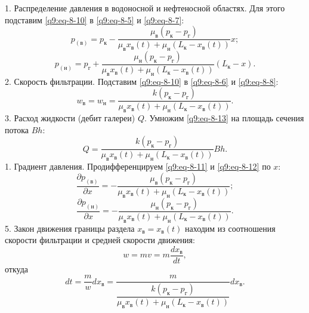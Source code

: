 1. Распределение давления в водоносной и нефтеносной областях. Для этого подставим \eqref{q9:eq-8-10} в \eqref{q9:eq-8-5} и \eqref{q9:eq-8-7}:
\begin{equation}p_{(\text{в})}=p_\text{к}-\frac{\mu_\text{в}(p_\text{к}-p_\text{г})}{\mu_\text{в}x_\text{в}(t)+\mu_\text{н}(L_\text{к}-x_\text{в}(t))}x;\tag{8.11}\label{q9:eq-8-11}\end{equation}
\begin{equation}p_{(\text{н})}=p_\text{г}+\frac{\mu_\text{н}(p_\text{к}-p_\text{г})}{\mu_\text{в}x_\text{в}(t)+\mu_\text{н}(L_\text{к}-x_\text{в}(t))}(L_\text{к}-x).\tag{8.12}\label{q9:eq-8-12}\end{equation}
2. Скорость фильтрации. Подставим \eqref{q9:eq-8-10} в \eqref{q9:eq-8-6} и \eqref{q9:eq-8-8}:
\begin{equation}w_\text{в}=w_\text{н}=\frac{k(p_\text{к}-p_\text{г})}{\mu_\text{в}x_\text{в}(t)+\mu_\text{н}(L_\text{к}-x_\text{в}(t))}.\tag{8.13}\label{q9:eq-8-13}\end{equation}
3. Расход жидкости (дебит галереи) $Q$.
Умножим \eqref{q9:eq-8-13} на площадь сечения потока $Bh$:
\begin{equation}Q=\frac{k(p_\text{к}-p_\text{г})}{\mu_\text{в}x_\text{в}(t)+\mu_\text{н}(L_\text{к}-x_\text{в}(t))}Bh.\tag{8.14}\label{q9:eq-8-14}\end{equation}
1. Градиент давления. Продифференцируем \eqref{q9:eq-8-11} и \eqref{q9:eq-8-12} по $x$:
\begin{equation}\frac{\partial p_{(\text{в})}}{\partial x}=-\frac{\mu_\text{в}(p_\text{к}-p_\text{г})}{\mu_\text{в}x_\text{в}(t)+\mu_\text{н}(L_\text{к}-x_\text{в}(t))};\tag{8.15}\label{q9:eq-8-15}\end{equation}
\begin{equation}\frac{\partial p_{(\text{н})}}{\partial x}=-\frac{\mu_\text{н}(p_\text{к}-p_\text{г})}{\mu_\text{в}x_\text{в}(t)+\mu_\text{н}(L_\text{к}-x_\text{в}(t))}.\tag{8.16}\label{q9:eq-8-16}\end{equation}
5. Закон движения границы раздела $x_\text{в}=x_\text{в}(t)$ находим из соотношения скорости фильтрации и средней скорости движения:
\[w=mv=m\frac{dx_\text{в}}{dt},\]
откуда
\begin{equation}dt=\frac{m}{w}dx_\text{в}=\frac{m}{\dfrac{k(p_\text{к}-p_\text{г})}{\mu_\text{в}x_\text{в}(t)+\mu_\text{н}(L_\text{к}-x_\text{в}(t))}}dx_\text{в}.\tag{8.17}\label{q9:eq-8-17}\end{equation}
